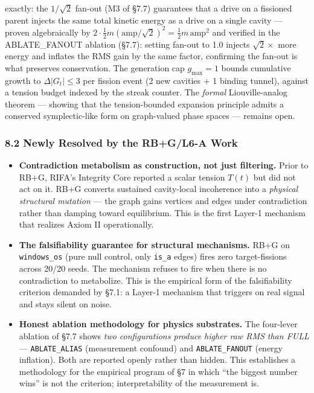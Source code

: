 \documentclass[
  11pt,
  a4paper,
]{article}
\begin{document}
\begin{itemize}
  exactly: the \(1/\sqrt{2}\) fan-out (M3 of §7.7) guarantees that a
  drive on a fissioned parent injects the same total kinetic energy as a
  drive on a single cavity --- proven algebraically by
  \(2 \cdot \frac{1}{2} m (\text{amp}/\sqrt{2})^2 = \frac{1}{2} m \, \text{amp}^2\)
  and verified in the ABLATE\_FANOUT ablation (§7.7): setting fan-out to
  1.0 injects \(\sqrt{2}\times\) more energy and inflates the RMS gain
  by the same factor, confirming the fan-out is what preserves
  conservation. The generation cap \(g_\text{max} = 1\) bounds
  cumulative growth to \(\Delta|G_t| \leq 3\) per fission event (2 new
  cavities + 1 binding tunnel), against a tension budget indexed by the
  streak counter. The \emph{formal} Liouville-analog theorem --- showing
  that the tension-bounded expansion principle admits a conserved
  symplectic-like form on graph-valued phase spaces --- remains open.
\end{itemize}

\subsubsection{8.2 Newly Resolved by the RB+G/L6-A
Work}\label{newly-resolved-by-the-rbgl6-a-work}

\begin{itemize}
\item
  \textbf{Contradiction metabolism as construction, not just filtering.}
  Prior to RB+G, RIFA's Integrity Core reported a scalar tension
  \(T(t)\) but did not act on it. RB+G converts sustained cavity-local
  incoherence into a \emph{physical structural mutation} --- the graph
  gains vertices and edges under contradiction rather than damping
  toward equilibrium. This is the first Layer-1 mechanism that realizes
  Axiom II operationally.
\item
  \textbf{The falsifiability guarantee for structural mechanisms.} RB+G
  on \texttt{windows\_os} (pure null control, only \texttt{is\_a} edges)
  fires zero target-fissions across 20/20 seeds. The mechanism refuses
  to fire when there is no contradiction to metabolize. This is the
  empirical form of the falsifiability criterion demanded by §7.1: a
  Layer-1 mechanism that triggers on real signal and stays silent on
  noise.
\item
  \textbf{Honest ablation methodology for physics substrates.} The
  four-lever ablation of §7.7 shows \emph{two configurations produce
  higher raw RMS than FULL} --- \texttt{ABLATE\_ALIAS} (measurement
  confound) and \texttt{ABLATE\_FANOUT} (energy inflation). Both are
  reported openly rather than hidden. This establishes a methodology for
  the empirical program of §7 in which ``the biggest number wins'' is
  not the criterion; interpretability of the measurement is.
\end{itemize}
\end{document}

